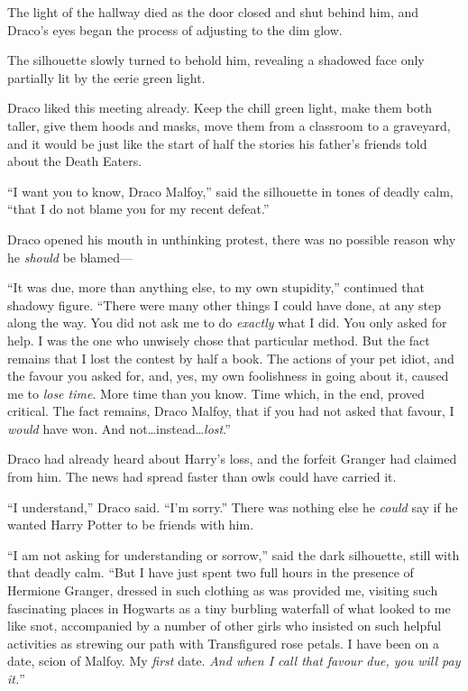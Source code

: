 The light of the hallway died as the door closed and shut behind him, and Draco’s eyes began the process of adjusting to the dim glow.

The silhouette slowly turned to behold him, revealing a shadowed face only partially lit by the eerie green light.

Draco liked this meeting already. Keep the chill green light, make them both taller, give them hoods and masks, move them from a classroom to a graveyard, and it would be just like the start of half the stories his father’s friends told about the Death Eaters.

“I want you to know, Draco Malfoy,” said the silhouette in tones of deadly calm, “that I do not blame you for my recent defeat.”

Draco opened his mouth in unthinking protest, there was no possible reason why he \emph{should} be blamed—

“It was due, more than anything else, to my own stupidity,” continued that shadowy figure. “There were many other things I could have done, at any step along the way. You did not ask me to do \emph{exactly} what I did. You only asked for help. I was the one who unwisely chose that particular method. But the fact remains that I lost the contest by half a book. The actions of your pet idiot, and the favour you asked for, and, yes, my own foolishness in going about it, caused me to \emph{lose time}. More time than you know. Time which, in the end, proved critical. The fact remains, Draco Malfoy, that if you had not asked that favour, I \emph{would} have won. And not…instead…\emph{lost}.”

Draco had already heard about Harry’s loss, and the forfeit Granger had claimed from him. The news had spread faster than owls could have carried it.

“I understand,” Draco said. “I’m sorry.” There was nothing else he \emph{could} say if he wanted Harry Potter to be friends with him.

“I am not asking for understanding or sorrow,” said the dark silhouette, still with that deadly calm. “But I have just spent two full hours in the presence of Hermione Granger, dressed in such clothing as was provided me, visiting such fascinating places in Hogwarts as a tiny burbling waterfall of what looked to me like snot, accompanied by a number of other girls who insisted on such helpful activities as strewing our path with Transfigured rose petals. I have been on a date, scion of Malfoy. My \emph{first} date. \emph{And when I call that favour due, you will pay it.}”

